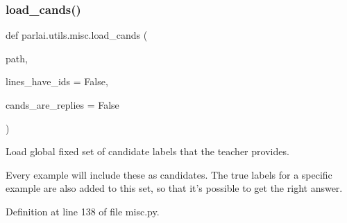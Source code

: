 \subsubsection{\texorpdfstring{load\+\_\+cands()}{load\_cands()}}
{\footnotesize\ttfamily def parlai.\+utils.\+misc.\+load\+\_\+cands (\begin{DoxyParamCaption}\item[{}]{path,  }\item[{}]{lines\+\_\+have\+\_\+ids = {\ttfamily False},  }\item[{}]{cands\+\_\+are\+\_\+replies = {\ttfamily False} }\end{DoxyParamCaption})}

\begin{DoxyVerb}Load global fixed set of candidate labels that the teacher provides.

Every example will include these as candidates. The true labels for a specific
example are also added to this set, so that it's possible to get the right answer.
\end{DoxyVerb}
 

Definition at line 138 of file misc.\+py.


